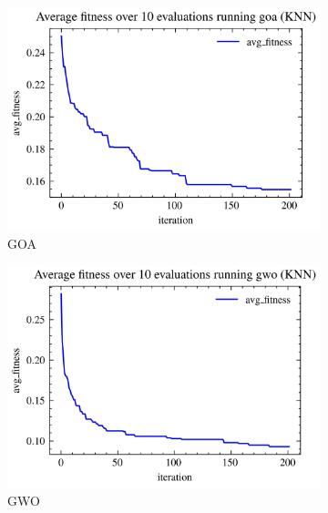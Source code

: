 \begin{figure}[H]
    \begin{subfigure}[b]{0.3\textwidth}
        \centering
        \includegraphics[width=\textwidth]{imagenes/binary_knn_fitness/KNN_fitness_over_10_evaluations_goa_binary_breast-cancer.jpg}
        \caption{GOA}
        \label{fig:sub10}
    \end{subfigure}
    \hfill
    \begin{subfigure}[b]{0.3\textwidth}
        \centering
        \includegraphics[width=\textwidth]{imagenes/binary_knn_fitness/KNN_fitness_over_10_evaluations_gwo_binary_breast-cancer.jpg}
        \caption{GWO}
        \label{fig:sub11}
    \end{subfigure}
    \hfill
    \begin{subfigure}[b]{0.3\textwidth}
        \centering

\end{subfigure}
\end{figure}
